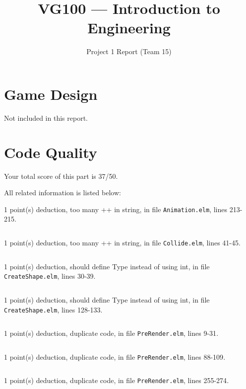 \documentclass{article}
\title{VG100 --- Introduction to\\ Engineering}
\subtitle{Project 1 Report (Team 15)}
\begin{document}
\maketitle

\section{Game Design}

Not included in this report.

\section{Code Quality}

Your total score of this part is 37/50. \medskip

All related information is listed below: \medskip

1 point(s) {\color{red}deduction}, too many ++ in string, in file {\color{blue}\texttt{Animation.elm}}, lines {\color{blue}213-215}.

\inputminted[firstline=213,lastline=215]{elm}{Animation.elm}

1 point(s) {\color{red}deduction}, too many ++ in string, in file {\color{blue}\texttt{Collide.elm}}, lines {\color{blue}41-45}.

\inputminted[firstline=41,lastline=45]{elm}{Collide.elm}

1 point(s) {\color{red}deduction}, should define Type instead of using int, in file {\color{blue}\texttt{CreateShape.elm}}, lines {\color{blue}30-39}.

\inputminted[firstline=30,lastline=39]{elm}{CreateShape.elm}

1 point(s) {\color{red}deduction}, should define Type instead of using int, in file {\color{blue}\texttt{CreateShape.elm}}, lines {\color{blue}128-133}.

\inputminted[firstline=128,lastline=133]{elm}{CreateShape.elm}

1 point(s) {\color{red}deduction}, duplicate code, in file {\color{blue}\texttt{PreRender.elm}}, lines {\color{blue}9-31}.

\inputminted[firstline=9,lastline=31]{elm}{PreRender.elm}

1 point(s) {\color{red}deduction}, duplicate code, in file {\color{blue}\texttt{PreRender.elm}}, lines {\color{blue}88-109}.

\inputminted[firstline=88,lastline=109]{elm}{PreRender.elm}

1 point(s) {\color{red}deduction}, duplicate code, in file {\color{blue}\texttt{PreRender.elm}}, lines {\color{blue}255-274}.
\end{document}
